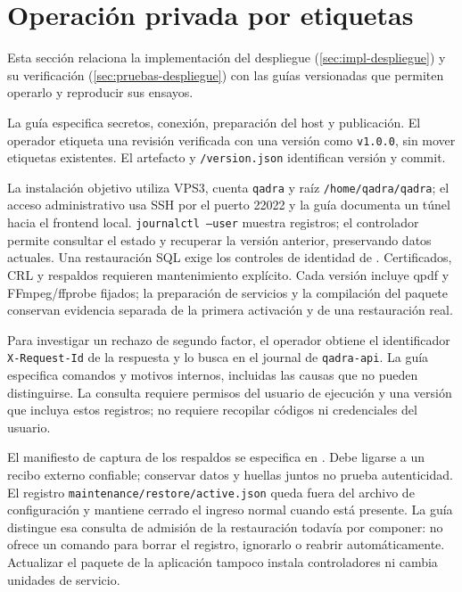 \section{Operación privada por etiquetas}\label{sec:anexo-despliegue}

Esta sección relaciona la implementación del despliegue
(\cref{sec:impl-despliegue}) y su verificación (\cref{sec:pruebas-despliegue})
con las guías versionadas que permiten operarlo y reproducir sus ensayos.

La guía  especifica secretos, conexión, preparación
del host y publicación. El operador etiqueta una revisión verificada con una
versión como \texttt{v1.0.0}, sin mover etiquetas existentes. El artefacto y
\texttt{/version.json} identifican versión y commit.

La instalación objetivo utiliza VPS3, cuenta \texttt{qadra} y raíz
\texttt{/home/qadra/qadra}; el acceso administrativo usa SSH por el puerto 22022
y la guía documenta un túnel hacia el frontend local.
\texttt{journalctl --user} muestra registros; el controlador permite consultar el estado y recuperar la versión anterior,
preservando datos actuales. Una restauración SQL exige los controles de identidad
de . Certificados, CRL y respaldos requieren
mantenimiento explícito. Cada versión incluye qpdf y FFmpeg/ffprobe fijados;
la preparación de servicios y la compilación del paquete conservan evidencia
separada de la primera activación y de una restauración real.

Para investigar un rechazo de segundo factor, el operador obtiene el identificador
\texttt{X-Request-Id} de la respuesta y lo busca en el journal de
\texttt{qadra-api}. La guía  especifica
comandos y motivos internos, incluidas las causas que no pueden distinguirse.
La consulta requiere permisos del usuario de ejecución y una versión que incluya
estos registros; no requiere recopilar códigos ni credenciales del usuario.

El manifiesto de captura de los respaldos se especifica en
. Debe ligarse a un recibo externo
confiable; conservar datos y huellas juntos no prueba autenticidad. El registro
\texttt{maintenance/restore/active.json} queda fuera del archivo de configuración
y mantiene cerrado el ingreso normal cuando está presente. La guía
 distingue esa consulta de admisión de
la restauración todavía por componer: no ofrece un comando para borrar el
registro, ignorarlo o reabrir automáticamente. Actualizar el paquete de la
aplicación tampoco instala controladores ni cambia unidades de servicio.

